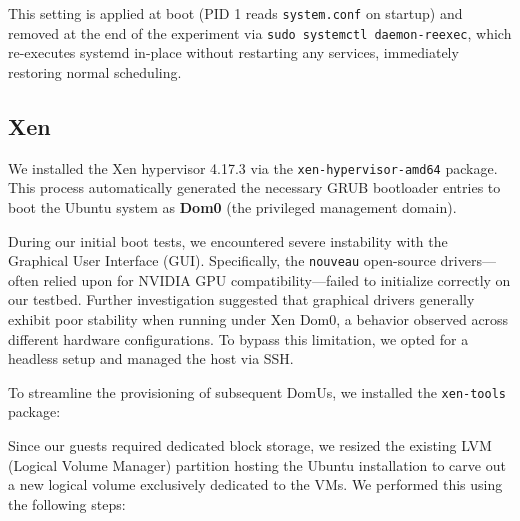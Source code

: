This setting is applied at boot (PID 1 reads \texttt{system.conf} on
startup) and removed at the end of the experiment via
\texttt{sudo\ systemctl\ daemon-reexec}, which re-executes systemd
in-place without restarting any services, immediately restoring normal
scheduling.

\subsection{Xen}\label{xen}

We installed the Xen hypervisor 4.17.3 via the
\texttt{xen-hypervisor-amd64} package. This process automatically
generated the necessary GRUB bootloader entries to boot the Ubuntu
system as \textbf{Dom0} (the privileged management domain).

\begin{Shaded}
\begin{Highlighting}[]
\end{Highlighting}
\end{Shaded}

During our initial boot tests, we encountered severe instability with
the Graphical User Interface (GUI). Specifically, the \texttt{nouveau}
open-source drivers---often relied upon for NVIDIA GPU
compatibility---failed to initialize correctly on our testbed. Further
investigation suggested that graphical drivers generally exhibit poor
stability when running under Xen Dom0, a behavior observed across
different hardware configurations. To bypass this limitation, we opted
for a headless setup and managed the host via SSH.

To streamline the provisioning of subsequent DomUs, we installed the
\texttt{xen-tools} package:

\begin{Shaded}
\begin{Highlighting}[]
\end{Highlighting}
\end{Shaded}

Since our guests required dedicated block storage, we resized the
existing LVM (Logical Volume Manager) partition hosting the Ubuntu
installation to carve out a new logical volume exclusively dedicated to
the VMs. We performed this using the following steps:

\begin{Shaded}
\begin{Highlighting}[]
\end{Highlighting}
\end{Shaded}

